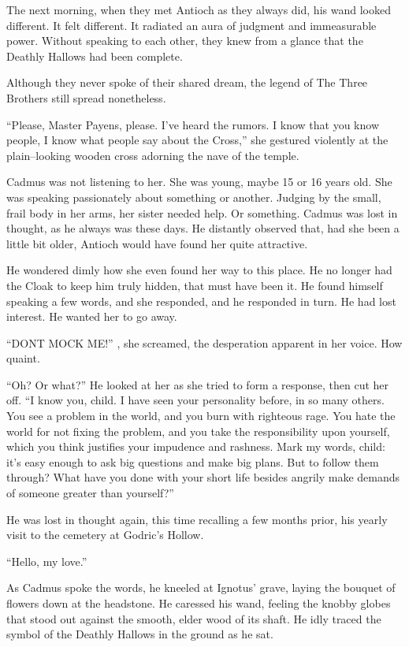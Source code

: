 The next morning, when they met Antioch as they always did, his wand looked different. It felt different. It radiated an aura of judgment and immeasurable power. Without speaking to each other, they knew from a glance that the Deathly Hallows had been complete.

Although they never spoke of their shared dream, the legend of The Three Brothers still spread nonetheless.

\simpleline
{}
“Please, Master Payens, please. I’ve heard the rumors. I know that you know people, I know what people say about the Cross,” she gestured violently at the plain\mbox{--}looking wooden cross adorning the nave of the temple.

Cadmus was not listening to her. She was young, maybe 15 or 16 years old. She was speaking passionately about something or another. Judging by the small, frail body in her arms, her sister needed help. Or something. Cadmus was lost in thought, as he always was these days. He distantly observed that, had she been a little bit older, Antioch would have found her quite attractive.

He wondered dimly how she even found her way to this place. He no longer had the Cloak to keep him truly hidden, that must have been it. He found himself speaking a few words, and she responded, and he responded in turn. He had lost interest. He wanted her to go away.

“DONT MOCK ME!” , she screamed, the desperation apparent in her voice. How quaint.

“Oh? Or what?” He looked at her as she tried to form a response, then cut her off. “I know you, child. I have seen your personality before, in so many others. You see a problem in the world, and you burn with righteous rage. You hate the world for not fixing the problem, and you take the responsibility upon yourself, which you think justifies your impudence and rashness. Mark my words, child: it’s easy enough to ask big questions and make big plans. But to follow them through? What have you done with your short life besides angrily make demands of someone greater than yourself?”

He was lost in thought again, this time recalling a few months prior, his yearly visit to the cemetery at Godric’s Hollow.

“Hello, my love.”

As Cadmus spoke the words, he kneeled at Ignotus’ grave, laying the bouquet of flowers down at the headstone. He caressed his wand, feeling the knobby globes that stood out against the smooth, elder wood of its shaft. He idly traced the symbol of the Deathly Hallows in the ground as he sat.

